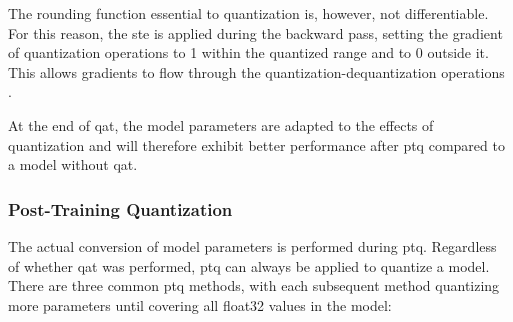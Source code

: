 {The rounding function essential to quantization is, however, not differentiable. For this reason, the \gls{ste} is applied during the backward pass,
setting the gradient of quantization operations to 1 within the quantized range and to 0 outside it.
This allows gradients to flow through the quantization-dequantization operations \cite{qatBackwardPass}.

At the end of \gls{qat}, the model parameters are adapted to the effects of quantization and will therefore exhibit better performance after \gls{ptq} compared to a model without \gls{qat}.


\subsubsection{Post-Training Quantization}

The actual conversion of model parameters is performed during \gls{ptq}.
Regardless of whether \gls{qat} was performed, \gls{ptq} can always be applied to quantize a model.
There are three common \gls{ptq} methods, with each subsequent method quantizing more parameters until covering all \gls{float32} values in the model:

}

